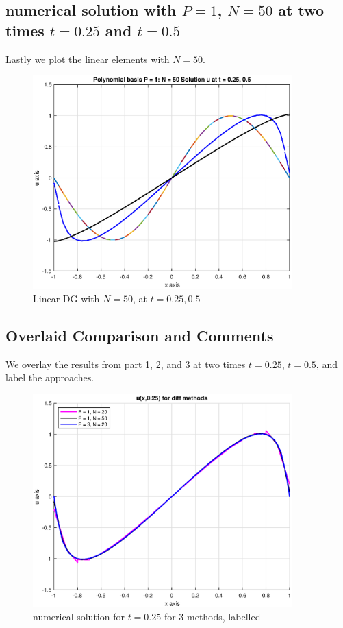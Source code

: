 \documentclass[12pt]{article} %
\newcommand{\1}[1]{\mathds{1}\left[#1\right]}
\begin{document}
\subsection{numerical solution with $P = 1$, $N = 50$ at two times $t = 0.25$ and $t = 0.5$}
\newpage
Lastly we plot the linear elements with $N = 50$.
\begin{figure}[t]
\includegraphics[width=10cm]{p3c.eps}
\centering
\caption{Linear DG with $N=50$, at $t = 0.25,0.5$}
\end{figure}


\subsection{Overlaid Comparison and Comments}
We overlay the results from part 1, 2, and 3 at two times $t = 0.25$, $t = 0.5$, and label the approaches.
\newpage
\begin{figure}[t]
\includegraphics[width=10cm]{p3cp25.eps}
\centering
\caption{numerical solution for $t = 0.25$ for 3 methods, labelled}
\end{figure}
\end{document}
